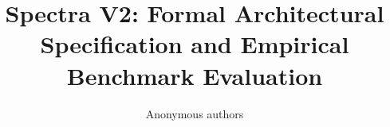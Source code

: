 \title{\textbf{Spectra V2: Formal Architectural Specification and Empirical Benchmark Evaluation}}

\author{Anonymous authors}

